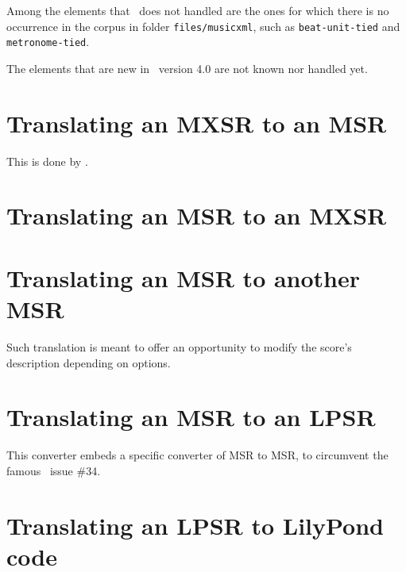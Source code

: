 Among the elements that \mf\ does not handled are the ones for which there is no occurrence in the corpus in folder {\tt files/musicxml}, such as {\tt beat-unit-tied} and {\tt metronome-tied}.

The elements that are new in \mxml\ version 4.0 are not known nor handled yet.


\section{Translating an MXSR to an MSR}

This is done by .


\section{Translating an MSR to an MXSR}


\section{Translating an MSR to another MSR}

Such translation is meant to offer an opportunity to modify the score's description depending on options.


\section{Translating an MSR to an LPSR}

This converter embeds a specific converter of MSR to MSR, to circumvent the famous \lily\ issue \#34.


\section{Translating an LPSR to LilyPond code}

